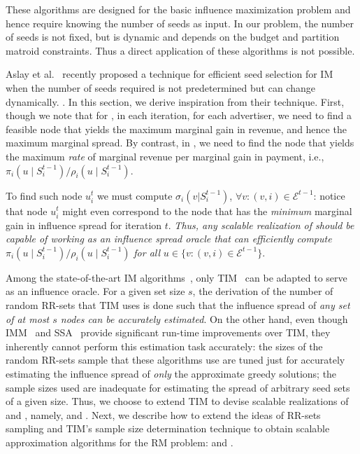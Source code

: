 These algorithms are designed for the basic influence maximization problem and hence require knowing the number of seeds as input. In our problem, the number of seeds is not fixed, but is dynamic and depends on the budget and partition matroid constraints. Thus a direct application of these algorithms is not possible.

Aslay et al.~\cite{AslayLB0L15} recently proposed a technique for efficient seed selection for IM when the number of seeds required is not predetermined but can change dynamically. . In this section, we derive inspiration from their technique. First, though we note that for \CARM, in each iteration, for each advertiser, we need to find a feasible node that yields the maximum marginal gain in revenue, and hence the maximum marginal spread. By contrast, in \CSRM, we need to find the node that yields the maximum \emph{rate} of marginal revenue per marginal gain in payment, i.e., $\pi_i(u \mid S_i^{t-1}) / \rho_i(u \mid S_i^{t-1})$.

To find such node $u_i^{t}$
we must compute $\sigma_i(v | S^{t-1}_i)$, $\forall v : (v,i) \in \mathcal{E}^{t-1}$: notice that node $u_i^{t}$ might even correspond to the node that has the \emph{minimum} marginal gain in influence spread for iteration $t$.
{\sl Thus, any scalable realization of \CSRM should be capable of working as an influence spread oracle that can efficiently compute} $\pi_i(u \mid S_i^{t-1}) / \rho_i(u \mid S_i^{t-1})$ {\sl for all} $u \in \{v : (v,i) \in \mathcal{E}^{t-1}\}$.

Among the state-of-the-art IM algorithms~\cite{tang14, tang2015influence, NguyenTD16}, only TIM~\cite{tang14} can be adapted to serve as an influence oracle. For a given set size $s$, the derivation of the number of random RR-sets that TIM uses is done such that the influence spread of {\sl any set of at most $s$ nodes can be accurately estimated}.
On the other hand, even though IMM~\cite{tang2015influence} and SSA~\cite{NguyenTD16} provide significant run-time improvements over TIM, they inherently cannot perform this estimation task accurately: the sizes of the random RR-sets sample that these algorithms use are tuned just for accurately estimating the influence spread of \emph{only} the approximate greedy solutions; the sample sizes used are inadequate for estimating the spread of arbitrary seed sets of a given size. Thus, we choose to extend TIM to devise scalable realizations of \CARM and \CSRM, namely, \fastca and \fastcs. Next, we describe how to extend the ideas of RR-sets sampling and TIM's sample size determination technique to obtain scalable approximation algorithms for the RM problem: \fastca  and \fastcs.

